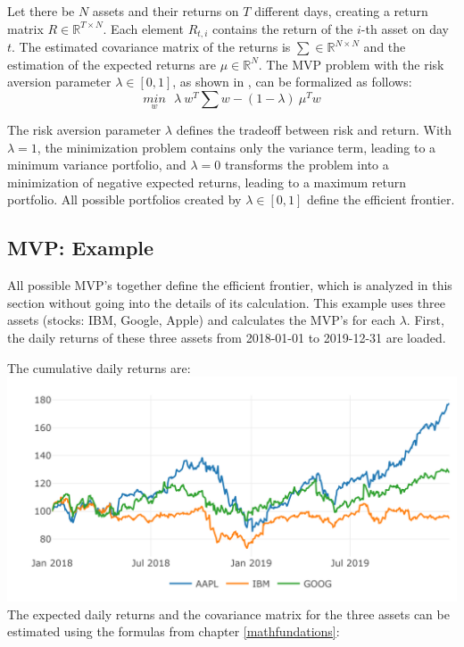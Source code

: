 \documentclass[
  oneside]{book}
\begin{document}
Let there be \(N\) assets and their returns on \(T\) different days, creating a return matrix \(R \in \mathbb{R}^{T \times N}\). Each element \(R_{t,i}\) contains the return of the \(i\)-th asset on day \(t\). The estimated covariance matrix of the returns is \(\textstyle\sum \in \mathbb{R}^{N \times N}\) and the estimation of the expected returns are \(\mu \in \mathbb{R}^{N}\). The MVP problem with the risk aversion parameter \(\lambda \in [0,1]\), as shown in \citep{Mari2005}, can be formalized as follows:
\begin{equation} 
\underset{w}{min} \ \ \ \lambda \ w^T \textstyle\sum w - (1-\lambda) \ \mu^T w
\label{eq:MVP}
\end{equation}

The risk aversion parameter \(\lambda\) defines the tradeoff between risk and return. With \(\lambda = 1\), the minimization problem contains only the variance term, leading to a minimum variance portfolio, and \(\lambda = 0\) transforms the problem into a minimization of negative expected returns, leading to a maximum return portfolio. All possible portfolios created by \(\lambda \in [0, 1]\) define the efficient frontier.

\hypertarget{mvp-example}{%
\subsection{MVP: Example}\label{mvp-example}}

All possible MVP's together define the efficient frontier, which is analyzed in this section without going into the details of its calculation. This example uses three assets (stocks: IBM, Google, Apple) and calculates the MVP's for each \(\lambda\). First, the daily returns of these three assets from 2018-01-01 to 2019-12-31 are loaded.

The cumulative daily returns are:\\
\includegraphics{Master_Thesis_files/figure-latex/MVP_ex2-1.png}
The expected daily returns and the covariance matrix for the three assets can be estimated using the formulas from chapter \ref{mathfundations}:
\end{document}
